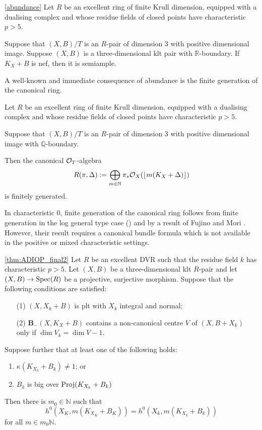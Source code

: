 	\begin{theorem}\label{Main_Abund1}\autoref{abundance}
		Let $R$ be an excellent ring of finite Krull dimension, equipped with a dualising complex and whose residue fields of closed points have characteristic $p>5$.
		
		Suppose that $(X,B)/T$ is an $R$-pair of dimension $3$ with positive dimensional image.
		Suppose $(X,B)$ is a three-dimensional klt pair with $\mathbb{R}$-boundary. If $K_X+B$ is nef, then it is semiample.
	\end{theorem}


	A well-known and immediate consequence of abundance is the finite generation of the canonical ring.
	
	\begin{theorem}
		Let $R$ be an excellent ring of finite Krull dimension, equipped with a dualising complex and whose residue fields of closed points have characteristic $p>5$.
		
		Suppose that $(X,B)/T$ is an $R$-pair of dimension $3$ with positive dimensional image with $\mathbb{Q}$-boundary. 
		
		Then the canonical $\ox[T]$-algebra
		\[R(\pi,\Delta):=\bigoplus_{m \in \mathbb{N}} \pi_{*}\ox(\lfloor m(K_{X}+\Delta)\rfloor)\]
		is finitely generated.
	\end{theorem}

	In characteristic $0$, finite generation of the canonical ring follows from finite generation in the log general type case (\cite{BCHM10}) and by a result of Fujino and Mori \cite[Theorem 5.2]{FM00}. However, their result requires a canonical bundle formula which is not available in the positive or mixed characteristic settings.


	\begin{theorem}\label{Main_Abund2}\autoref{thm:ADIOP_final2}
		Let $R$ be an excellent DVR such that the residue field $k$ has characteristic $p>5$.
		Let $(X,B)$ be a three-dimensional klt $R$-pair and let $(X,B)\to \Spec(R)$ be a projective, surjective morphism.  Suppose that the following conditions are satisfied:
		
		\begin{enumerate}
		\item[(1)] $(X,X_{k}+B)$ is plt with $X_k$ integral and normal;
		\item[(2)] ${\mathbf{B}_{-}(X, K_{X}+B)}$ contains a non-canonical centre $V$ of $(X,B+X_{k})$ only if $\dim V_{k}=\dim V -1$.
		\end{enumerate}
		Suppose further that at least one of the following holds:
		\begin{enumerate}
			\item $\kappa(K_{X_{k}}+B_{k}) \neq 1$; or
			\item $B_{k}$ is big over $\textup{Proj}(K_{X_{k}}+B_{k})$
		\end{enumerate}	
		Then there is $m_{0} \in \mathbb{N}$ such that 
		$$h^{0}(X_{K},m(K_{X_{K}}+B_{K}))=h^{0}(X_{k},m(K_{X_{k}}+B_{k}))$$
		for all $m \in m_{0}\mathbb{N}$.
		
	\end{theorem}

